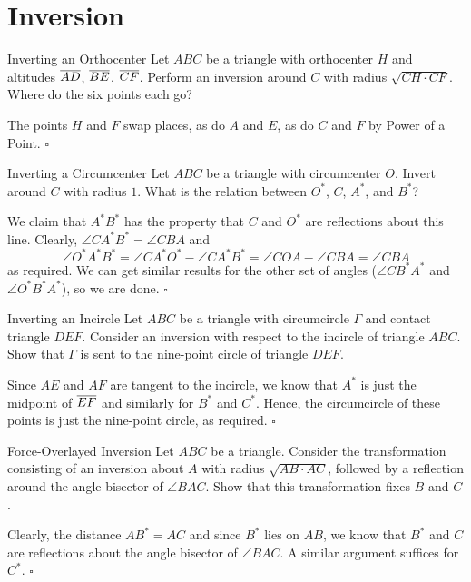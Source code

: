 \documentclass{article}
\begin{document}
\newpage

\section{Inversion}

\begin{problem}[8.9]{Inverting an Orthocenter}
Let $ABC$ be a triangle with orthocenter $H$ and altitudes $\overline{AD}$, $\overline{BE}$, $\overline{CF}$. Perform an inversion around $C$ with radius $\sqrt{CH \cdot CF}$. Where do the six points each go?
\end{problem}
The points $H$ and $F$ swap places, as do $A$ and $E$, as do $C$ and $F$ by Power of a Point. $\square$

\begin{problem}[8.10]{Inverting a Circumcenter}
Let $ABC$ be a triangle with circumcenter $O$. Invert around $C$ with radius $1$. What is the relation between $O^*$, $C$, $A^*$, and $B^*$?
\end{problem}
We claim that $A^*B^*$ has the property that $C$ and $O^*$ are reflections about this line. Clearly, $\angle CA^*B^* = \angle CBA$ and \[\angle O^*A^*B^* = \angle CA^*O^* - \angle CA^*B^* = \angle COA - \angle CBA = \angle CBA\] as required. We can get similar results for the other set of angles ($\angle CB^*A^*$ and $\angle O^*B^*A^*$), so we are done. $\square$

\begin{problem}[8.11]{Inverting an Incircle}
Let $ABC$ be a triangle with circumcircle $\Gamma$ and contact triangle $DEF$. Consider an inversion with respect to the incircle of triangle $ABC$. Show that $\Gamma$ is sent to the nine-point circle of triangle $DEF$.
\end{problem}
Since $AE$ and $AF$ are tangent to the incircle, we know that $A^*$ is just the midpoint of $\overline{EF}$ and similarly for $B^*$ and $C^*$. Hence, the circumcircle of these points is just the nine-point circle, as required. $\square$

\begin{problem}[8.17]{Force-Overlayed Inversion}
Let $ABC$ be a triangle. Consider the transformation consisting of an inversion about $A$ with radius $\sqrt{AB \cdot AC}$, followed by a reflection around the angle bisector of $\angle BAC$. Show that this transformation fixes $B$ and $C$.
\end{problem}
Clearly, the distance $AB^* = AC$ and since $B^*$ lies on $AB$, we know that $B^*$ and $C$ are reflections about the angle bisector of $\angle BAC$. A similar argument suffices for $C^*$. $\square$
\end{document}
